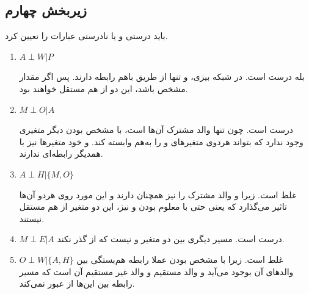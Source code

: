 \subsection{زیربخش چهارم}
باید درستی و یا نادرستی عبارات را تعیین کرد.
\begin{enumerate}
	\item 
	$
	A \perp  W | P
	$

بله درست است. در شبکه بیزی، 
و
تنها از طریق 
باهم رابطه دارند. پس اگر مقدار 
مشخص باشد، این دو از هم مستقل خواهند بود.
\item 
$
M \perp O | A
$

درست است. چون 
تنها والد مشترک آن‌ها است، با مشخص بودن 
دیگر متغیری وجود ندارد که بتواند هردوی متغیرهای 
و
را به‌هم وابسته کند. و خود متغیرها نیز با همدیگر رابطه‌ای ندارند.

\item 
$
A \perp H | \{M, O\}
$

غلط است. زیرا 
و
والد مشترک 
را نیز همچنان دارند و این مورد روی هردو آن‌ها تاثیر می‌گذارد که یعنی حتی با معلوم بودن
و
نیز، این دو متغیر از هم مستقل نیستند.
\item 
$
M \perp E | A
$
درست است. مسیر دیگری بین دو متغیر 
و
نیست که از 
گذر نکند.

\item 
$
O \perp W | \{A, H\}
$
غلط است. زیرا با مشخص بودن 
عملا رابطه هم‌بستگی بین والدهای آن بوجود می‌آید و 
والد مستقیم و 
والد غیر مستقیم آن است که مسیر رابطه بین این‌ها از 
عبور نمی‌کند.
\end{enumerate}

